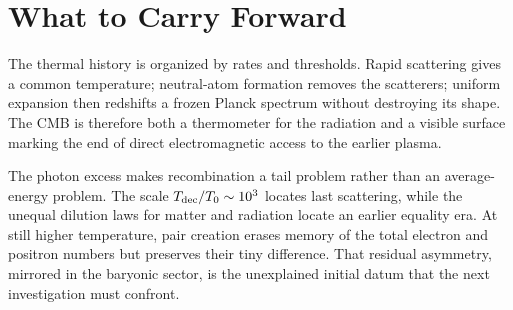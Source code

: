 \section{What to Carry Forward}

The thermal history is organized by rates and thresholds. Rapid scattering gives a common temperature; neutral-atom formation removes the scatterers; uniform expansion then redshifts a frozen Planck spectrum without destroying its shape. The CMB is therefore both a thermometer for the radiation and a visible surface marking the end of direct electromagnetic access to the earlier plasma.

The photon excess makes recombination a tail problem rather than an average-energy problem. The scale \(T_{\rm dec}/T_0\sim10^3\) locates last scattering, while the unequal dilution laws for matter and radiation locate an earlier equality era. At still higher temperature, pair creation erases memory of the total electron and positron numbers but preserves their tiny difference. That residual asymmetry, mirrored in the baryonic sector, is the unexplained initial datum that the next investigation must confront.
